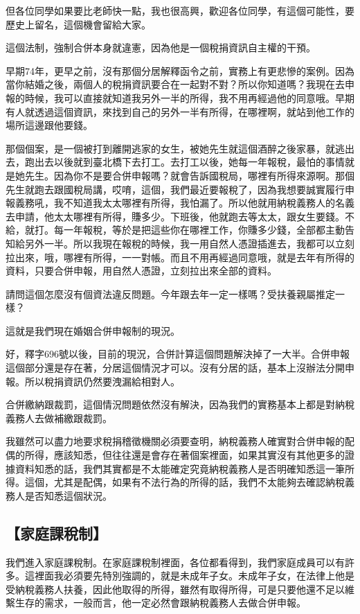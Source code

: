 \documentclass[oneside,sub3section]{ctexbook}
\begin{document}
但各位同學如果要比老師快一點，我也很高興，歡迎各位同學，有這個可能性，要歷史上留名，這個機會留給大家。

這個法制，強制合併本身就違憲，因為他是一個稅捐資訊自主權的干預。

早期74年，更早之前，沒有那個分居解釋函令之前，實務上有更悲慘的案例。因為當你結婚之後，兩個人的稅捐資訊要合在一起對不對？所以你知道嗎？我現在去申報的時候，我可以直接就知道我另外一半的所得，我不用再經過他的同意哦。早期有人就透過這個資訊，來找到自己的另外一半有所得，在哪裡啊，就站到他工作的場所這邊跟他要錢。

那個個案，是一個被打到離開逃家的女生，被她先生就這個酒醉之後家暴，就逃出去，跑出去以後就到臺北橋下去打工。去打工以後，她每一年報稅，最怕的事情就是她先生。因為你不是要合併申報嗎？就會告訴國稅局，哪裡有所得來源啊。那個先生就跑去跟國稅局講，哎唷，這個，我們最近要報稅了，因為我想要誠實履行申報義務吼，我不知道我太太哪裡有所得，我怕漏了。所以他就用納稅義務人的名義去申請，他太太哪裡有所得，賺多少。下班後，他就跑去等太太，跟女生要錢。不給，就打。每一年報稅，等於是把這些你在哪裡工作，你賺多少錢，全部都主動告知給另外一半。所以我現在報稅的時候，我一用自然人憑證插進去，我都可以立刻拉出來，哦，哪裡有所得，一一對帳。而且不用再經過同意哦，就是去年有所得的資料，只要合併申報，用自然人憑證，立刻拉出來全部的資料。

請問這個怎麼沒有個資法違反問題。今年跟去年一定一樣嗎？受扶養親屬推定一樣？

這就是我們現在婚姻合併申報制的現況。

好，釋字696號以後，目前的現況，合併計算這個問題解決掉了一大半。合併申報這個部分還是存在著，分居這個情況才可以。沒有分居的話，基本上沒辦法分開申報。所以稅捐資訊仍然要洩漏給相對人。

合併繳納跟裁罰，這個情況問題依然沒有解決，因為我們的實務基本上都是對納稅義務人去做補繳跟裁罰。

我雖然可以盡力地要求稅捐稽徵機關必須要查明，納稅義務人確實對合併申報的配偶的所得，應該知悉，但往往還是會存在著個案裡面，如果其實沒有其他更多的證據資料知悉的話，我們其實都是不太能確定究竟納稅義務人是否明確知悉這一筆所得。這個，尤其是配偶，如果有不法行為的所得的話，我們不太能夠去確認納稅義務人是否知悉這個狀況。

\hypertarget{ux5bb6ux5eadux8ab2ux7a05ux5236}{%
\subsection{【家庭課稅制】}\label{ux5bb6ux5eadux8ab2ux7a05ux5236}}

我們進入家庭課稅制。在家庭課稅制裡面，各位都看得到，我們家庭成員可以有許多。這裡面我必須要先特別強調的，就是未成年子女。未成年子女，在法律上他是受納稅義務人扶養，因此他取得的所得，雖然有取得所得，可是只要他還不足以維繫生存的需求，一般而言，他一定必然會跟納稅義務人去做合併申報。
\end{document}
